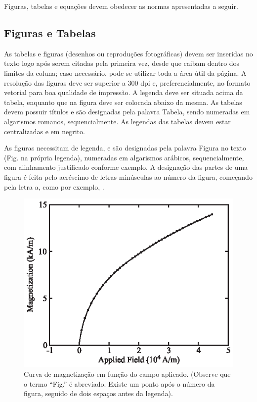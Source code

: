 Figuras, tabelas e equações devem obedecer as normas apresentadas a seguir.

\subsection{Figuras e Tabelas}

As tabelas e figuras (desenhos ou reproduções fotográficas) devem ser inseridas no texto logo após serem citadas pela primeira vez, desde que caibam dentro dos limites da coluna; caso necessário, pode-se utilizar toda a área útil da página. A resolução das figuras deve ser superior a 300 dpi e, preferencialmente, no formato vetorial para boa qualidade de impressão. A legenda deve ser situada acima da tabela, enquanto que na figura deve ser colocada abaixo da mesma. As tabelas devem possuir títulos e são designadas pela palavra Tabela, sendo numeradas em algarismos romanos, sequencialmente. As legendas das tabelas devem estar centralizadas e em negrito.  

As figuras necessitam de legenda, e são designadas pela palavra Figura no texto (Fig. na própria legenda), numeradas em algarismos arábicos, sequencialmente, com alinhamento justificado conforme exemplo. A designação das partes de uma figura é feita pelo acréscimo de letras minúsculas ao número da figura, começando pela letra a, como por exemplo, .


\begin{figure}[!ht]
	\centering
    \includegraphics[width=1\linewidth]{Figs/figure}
	\caption{Curva de magnetização em função do campo aplicado. (Observe que o termo ``Fig.'' é abreviado. Existe um ponto após o número da figura, seguido de dois espaços antes da legenda).}
	\label{fig:fig1}
\end{figure}



